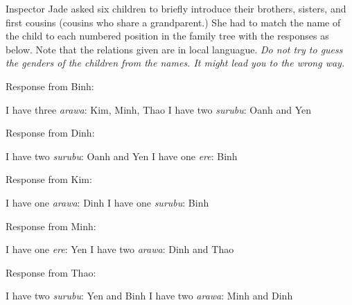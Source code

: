 \documentclass{article}
\begin{document}
\begin{example*}

    Inspector Jade asked six children to briefly introduce their brothers, sisters,
    and first cousins (cousins who share a grandparent.)
    She had to match the name of the child to each numbered position in the family tree
    with the responses as below. Note that the relations given are in local languague.
    \textit{Do not try to guess the genders of the children from the names. It might lead you to the wrong way.}

    \begin{center}
        \begin{minipage}[t]{7cm}
            Response from Binh:
            \begin{itemize}[topsep=0pt, partopsep=0pt, itemsep=0pt]
                \ii I have three \textit{arawa}: Kim, Minh, Thao
                \ii I have two \textit{surubu}: Oanh and Yen
            \end{itemize}
        \end{minipage}
        \hfill
        \begin{minipage}[t]{7cm}
            Response from Dinh:
            \begin{itemize}[topsep=0pt, partopsep=0pt, itemsep=0pt]
                \ii I have two \textit{surubu}: Oanh and Yen
                \ii I have one \textit{ere}: Binh
            \end{itemize}
        \end{minipage}
        \bigbreak
        \begin{minipage}[t]{7cm}
            Response from Kim:
            \begin{itemize}[topsep=0pt, partopsep=0pt, itemsep=0pt]
                \ii I have one \textit{arawa}: Dinh
                \ii I have one \textit{surubu}: Binh
            \end{itemize}
        \end{minipage}
        \hfill
        \begin{minipage}[t]{7cm}
            Response from Minh:
            \begin{itemize}[topsep=0pt, partopsep=0pt, itemsep=0pt]
                \ii I have one \textit{ere}: Yen
                \ii I have two \textit{arawa}: Dinh and Thao
            \end{itemize}
        \end{minipage}
        \bigbreak
        \begin{minipage}[t]{7cm}
            Response from Thao:
            \begin{itemize}[topsep=0pt, partopsep=0pt, itemsep=0pt]
                \ii I have two \textit{surubu}: Yen and Binh
                \ii I have two \textit{arawa}: Minh and Dinh 
            \end{itemize}
        \end{minipage}
        \hfill
        \begin{minipage}[t]{7cm}
        \end{minipage}
    \end{center}

\end{example*}
\end{document}
